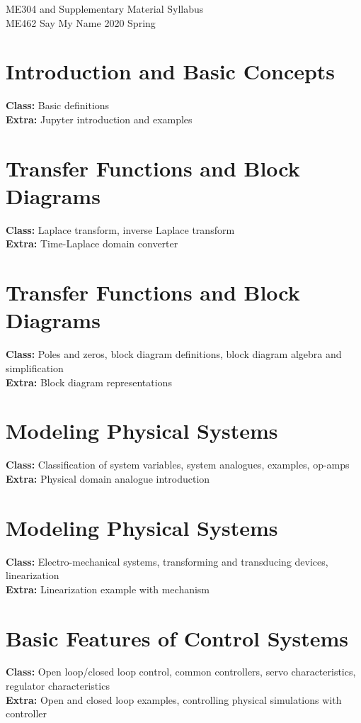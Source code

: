 \documentclass[margin]{scrartcl}
\begin{document}
\begin{center}
	{\Huge ME304 and Supplementary Material Syllabus} \\
	{\Large ME462 Say My Name 2020 Spring}
\end{center}

\section{Introduction and Basic Concepts}
\textbf{Class:} Basic definitions \\
\textbf{Extra:} Jupyter introduction and examples

\section{Transfer Functions and Block Diagrams}
\textbf{Class:} Laplace transform, inverse Laplace transform \\ 
\textbf{Extra:} Time-Laplace domain converter

\section{Transfer Functions and Block Diagrams}
\textbf{Class:} Poles and zeros, block diagram definitions, block diagram algebra and simplification \\ 
\textbf{Extra:} Block diagram representations

\section{Modeling Physical Systems}
\textbf{Class:} Classification of system variables, system analogues, examples, op-amps \\ 
\textbf{Extra:} Physical domain analogue introduction

\section{Modeling Physical Systems}
\textbf{Class:} Electro-mechanical systems, transforming and transducing devices, linearization \\ 
\textbf{Extra:} Linearization example with mechanism

\section{Basic Features of Control Systems}
\textbf{Class:} Open loop/closed loop control, common controllers, servo characteristics, regulator characteristics \\
\textbf{Extra:} Open and closed loop examples, controlling physical simulations with controller
\end{document}
